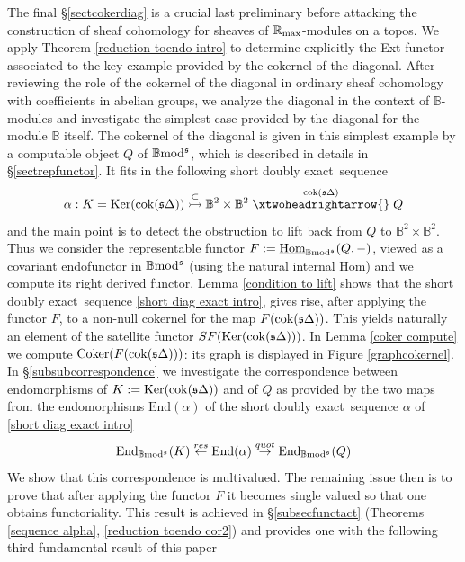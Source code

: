 \documentclass[12pt]{article}
\def\End{{\rm End}}
\def\Homi{{\underline{\rm Hom}}}
\def\coker{{\rm Coker}}
\def\scoker{{\rm cok}}
\def\B{{\mathbb B}}
\def\R{{\mathbb R}}
\def\exxx{{doubly exact}~}
\def\ker{{\mbox{Ker}}}
\def\End{{\mbox{End}}}
\def\yb{\mathfrak{s}}
\def\rma{\R_{\rm max}}
\def\b2{{\rm \B mod^{\mathfrak s}}}
\begin{document}
  

 The final \S\ref{sectcokerdiag}  is a crucial last preliminary before attacking the construction of  sheaf cohomology for sheaves of $\rma$-modules on a topos. We apply Theorem \ref{reduction toendo intro} to determine explicitly the Ext functor associated to the  key example provided by the cokernel of the diagonal.  After reviewing the role of the cokernel of the diagonal in ordinary sheaf cohomology with coefficients in abelian groups, we analyze the diagonal in the context of $\B$-modules and investigate the simplest case provided by the diagonal for the module $\B$ itself. The cokernel of the diagonal is given in this simplest example by a computable object $Q$ of $\b2$, which is described in details in \S \ref{sectrepfunctor}. 
It fits in the following short \exxx sequence
\begin{equation}\label{short diag exact intro}
	\alpha:K=\ker(\scoker(\yb\Delta))\stackrel{\subset}{\rightarrowtail} \B^2\times \B^2\stackrel{\scoker(\yb\Delta)}{\xtwoheadrightarrow{}}Q
\end{equation}
and the main point is to detect the obstruction to lift back from $Q$ to $\B^2\times \B^2$. Thus we  consider the representable functor $F:=\Homi_\b2(Q,-)$, viewed as a covariant endofunctor in $\b2$  (using the natural internal Hom) and we compute its right derived functor.
 Lemma \ref{condition to lift} shows that the short \exxx sequence \eqref{short diag exact intro},  gives rise, after applying the functor  $F$, to a non-null cokernel for the map  $F(\scoker(\yb\Delta))$. This yields naturally an element of the satellite functor $SF(\ker(\scoker(\yb\Delta)))$. In Lemma \ref{coker compute} we compute $\coker(F(\scoker(\yb\Delta)))$: its graph is displayed in Figure \ref{graphcokernel}. In \S \ref{subsubcorrespondence} we investigate the correspondence between endomorphisms of $K:=\ker(\scoker(\yb\Delta))$ and of $Q$ as provided by the two maps from the endomorphisms $\End(\alpha)$ of the short \exxx sequence $\alpha$ of \eqref{short diag exact intro} \begin{equation}\label{quotient map intro}
	\End_\b2(K)\stackrel{{ res}}{\leftarrow} \End(\alpha)\stackrel{{ quot}}{\to} \End_\b2(Q)
\end{equation}
 We   show that this correspondence  is multivalued. The remaining issue then is to prove that after applying the functor $F$ it becomes single valued so that one obtains functoriality. This result is achieved in \S \ref{subsecfunctact}  (Theorems \ref{sequence alpha}, \ref{reduction toendo cor2}) and provides one with the following third fundamental result of this paper  
\end{document}

